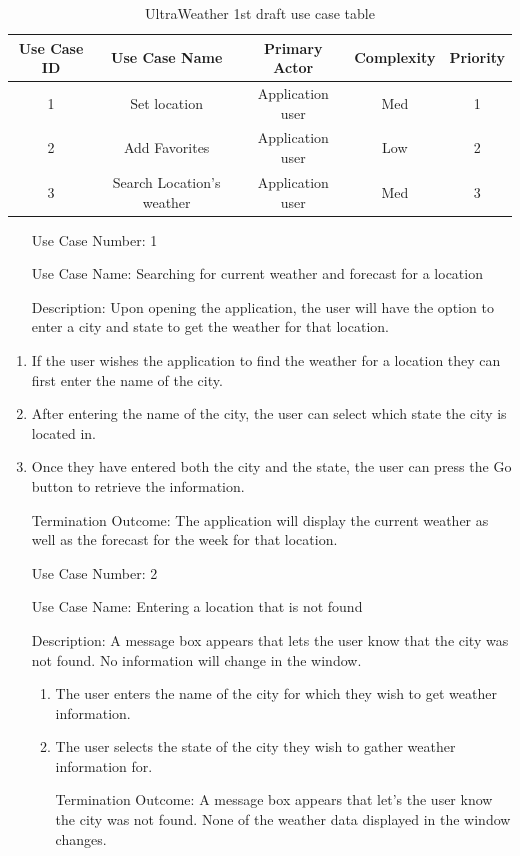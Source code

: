 \documentclass[10pt,conference,onecolumn,compsoc]{IEEEtran}
\begin{document}
\begin{table}
\centering
\begin{tabular}{|c|c|c|c|c|}
\hline
Use Case ID & Use Case Name & Primary Actor & Complexity & Priority \\
\hline \hline
1 & Set location & Application user & Med & 1\\
\hline
2 & Add Favorites & Application user & Low & 2\\
\hline
3 & Search Location's weather & Application user & Med & 3\\
\hline

\end{tabular}
\caption{UltraWeather 1st draft use case table}
\label{tab:useCaseIndex}
\end{table}

\begin{itemize}
\item[Use Case Number:] 1
\item[Use Case Name:] Searching for current weather and forecast for a location
\item[Description:] Upon opening the application, the user will have the option to enter a city and state to get the weather for that location.
\end{itemize}

\begin{enumerate}
\item If the user wishes the application to find the weather for a location they can first enter the name of the city.
\item After entering the name of the city, the user can select which state the city is located in.
\item Once they have entered both the city and the state, the user can press the Go button to retrieve the information.  
\item[Termination Outcome:] The application will display the current weather as well as the forecast for the week for that location.
\end{enumerate}

\begin{itemize}
\item[Use Case Number:] 2
\item[Use Case Name:] Entering a location that is not found
\item[Description:] A message box appears that lets the user know that the city was not found. No information will change in the window.

\begin{enumerate}
\item The user enters the name of the city for which they wish to get weather information.
\item The user selects the state of the city they wish to gather weather information for. 
\item[Termination Outcome:] A message box appears that let's the user know the city was not found. None of the weather data displayed in the window changes.
\end{enumerate}

\end{itemize}
\end{document}
